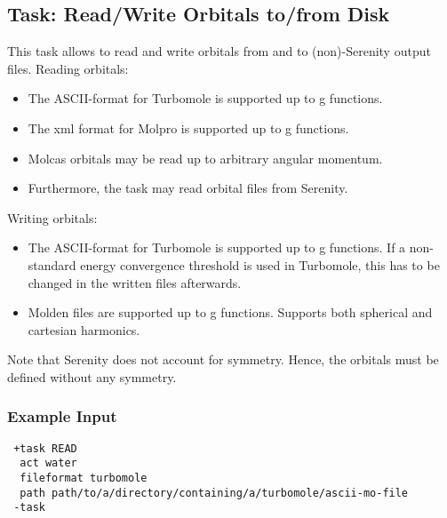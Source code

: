\subsection{Task: Read/Write Orbitals to/from Disk}

This task allows to read and write orbitals from and to (non)-Serenity output files.\newline
Reading orbitals:
\begin{itemize}
  \item The ASCII-format for Turbomole is supported up to g functions.
  \item The xml format for Molpro is supported up to g functions.
  \item Molcas orbitals may be read up to arbitrary angular momentum.
  \item Furthermore, the task may read orbital files from Serenity.
\end{itemize}
Writing orbitals:
\begin{itemize}
  \item The ASCII-format for Turbomole is supported up to g functions. If a non-standard energy convergence threshold is used in Turbomole, this has to be changed in the written files afterwards.
  \item Molden files are supported up to g functions. Supports both spherical and cartesian harmonics.
\end{itemize}
Note that Serenity does not account for symmetry. Hence, the orbitals must be defined without any symmetry.
\subsubsection{Example Input}
\begin{lstlisting}
 +task READ
  act water
  fileformat turbomole
  path path/to/a/directory/containing/a/turbomole/ascii-mo-file
 -task
\end{lstlisting}

